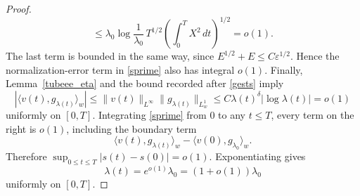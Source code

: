 \documentclass[11pt,a4paper]{article}
\numberwithin{equation}{section}
\theoremstyle{plain}
\theoremstyle{remark}
\begin{document}
\begin{proof}
$$\leq
\lambda_0\log\frac1{\lambda_0}\,
T^{1/2}
\left(\int_0^TX^2\,dt\right)^{1/2}
=o(1).
$$
The last term is bounded in the same way, since
$E^{1/2}+E\leq C\varepsilon^{1/2}$. Hence the normalization-error
term in \eqref{sprime} also has integral $o(1)$.
Finally, Lemma~\ref{tubeee_eta} and the bound recorded after
\eqref{gests} imply
$$
|\langle v(t),g_{\lambda(t)}\rangle_w|
\leq
\|v(t)\|_{L^\infty}
\|g_{\lambda(t)}\|_{L_w^1}
\leq
C\lambda(t)^\delta
\left|\log\lambda(t)\right|
=o(1)
$$
uniformly on $[0,T]$.
Integrating \eqref{sprime} from $0$ to any
$t\leq T$, every term on the right is $o(1)$, including the boundary term
$$
\langle v(t),g_{\lambda(t)}\rangle_w
-
\langle v(0),g_{\lambda_0}\rangle_w.
$$
Therefore $\sup_{0\leq t\leq T}|s(t)-s(0)|=o(1)$. Exponentiating gives
$$
\lambda(t)=e^{o(1)}\lambda_0=(1+o(1))\lambda_0
$$
uniformly on $[0,T]$.
\end{proof}
\end{document}
